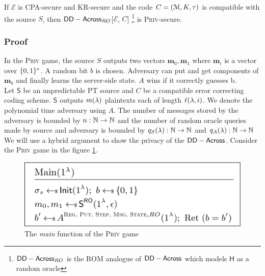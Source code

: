 \begin{theorem}
	If $\mathcal{E}$ is CPA-secure and KR-secure and the code $C=(\mathcal{M}, K, \tau)$ is compatible with the source $S$, then $\mathsf{DD-Across}_{RO}$[$\mathcal{E}$, $C$] \footnote{$\mathsf{DD-Across}_{RO}$ is the ROM analogue of $\mathsf{DD-Across}$ which models $\mathsf{H}$ as a random oracle} is \textsc{Priv}-secure.
\end{theorem}

\subsubsection*{Proof}
In the \textsc{Priv} game, the source $S$ outputs two vectors $\textbf{m}_0, \textbf{m}_1$ where $\textbf{m}_i$ is a vector over $\{0,1\}^*$. A random bit $b$ is chosen. Adversary can put and get components of $\textbf{m}_b$ and finally learns the server-side state. $A$ wins if it correctly guesses b.\\

Let $\mathsf{S}$ be an unpredictable PT source and $C$ be a compatible error correcting coding scheme. $\mathsf{S}$ outputs $m(\lambda)$ plaintexts each of length $\ell(\lambda, i)$. We denote the polynomial time adversary using $A$. The number of messages stored by the adversary is bounded by $n: \mathbb{N} \rightarrow \mathbb{N}$ and the number of random oracle queries made by source and adversary is bounded by $q_S(\lambda): \mathbb{N} \rightarrow \mathbb{N} $ and $q_A(\lambda): \mathbb{N} \rightarrow \mathbb{N} $
\\ 
We will use a hybrid argument to show the privacy of the $\mathsf{DD-Across}$. Consider the \textsc{Priv} game in the figure \ref{fig:priv}.\\
\begin{figure}
	\centering
	\includegraphics[scale=0.3]{Priv_game}
	\caption{The \textit{main} function of the \textsc{Priv} game}
	\label{fig:priv}
\end{figure}

